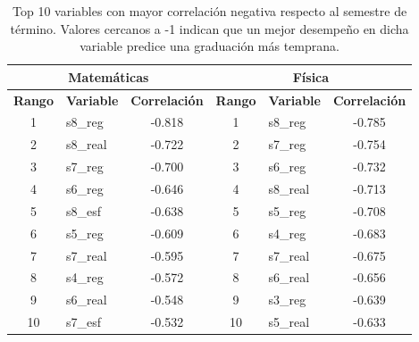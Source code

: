 
\begin{table}[H]
\centering
\footnotesize
\begin{tabular}{|c|l|c|c|l|c|}
\hline
\multicolumn{3}{|c|}{\textbf{Matemáticas}} & \multicolumn{3}{c|}{\textbf{Física}} \\ \hline
\textbf{Rango} & \textbf{Variable} & \textbf{Correlación} & \textbf{Rango} & \textbf{Variable} & \textbf{Correlación} \\ \hline
1 & s8\_reg & -0.818 & 1 & s8\_reg & -0.785 \\ \hline
2 & s8\_real & -0.722 & 2 & s7\_reg & -0.754 \\ \hline
3 & s7\_reg & -0.700 & 3 & s6\_reg & -0.732 \\ \hline
4 & s6\_reg & -0.646 & 4 & s8\_real & -0.713 \\ \hline
5 & s8\_esf & -0.638 & 5 & s5\_reg & -0.708 \\ \hline
6 & s5\_reg & -0.609 & 6 & s4\_reg & -0.683 \\ \hline
7 & s7\_real & -0.595 & 7 & s7\_real & -0.675 \\ \hline
8 & s4\_reg & -0.572 & 8 & s6\_real & -0.656 \\ \hline
9 & s6\_real & -0.548 & 9 & s3\_reg & -0.639 \\ \hline
10 & s7\_esf & -0.532 & 10 & s5\_real & -0.633 \\ \hline

\end{tabular}
\caption{Top 10 variables con mayor correlación negativa respecto al semestre de término. Valores cercanos a -1 indican que un mejor desempeño en dicha variable predice una graduación más temprana.}
\label{tab:correlaciones_target}
\end{table}
